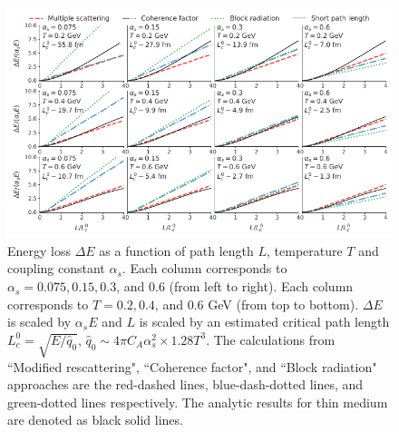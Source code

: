 \documentclass[aps, prc, reprint, amsmath, groupedaddress, nofootinbib]{revtex4-1}
\begin{document}
\begin{figure}
\includegraphics[width=\textwidth]{Eloss_Ldep.pdf}
\caption{Energy loss $\Delta E$ as a function of path length $L$, temperature $T$ and coupling constant $\alpha_s$. Each column corresponds to $\alpha_s = 0.075, 0.15, 0.3$, and $0.6$ (from left to right). Each column corresponds to $T = 0.2, 0.4$, and $0.6$ GeV (from top to bottom). $\Delta E$ is scaled by $\alpha_s E$ and $L$ is scaled by an estimated critical path length $L_c^0 = \sqrt{E/\hat{q}_0}$, $\hat{q}_0\sim 4\pi C_A\alpha_s^2 \times 1.28 T^3$. The calculations from ``Modified rescattering", ``Coherence factor", and ``Block radiation" approaches are the red-dashed lines, blue-dash-dotted lines, and green-dotted lines respectively. The analytic results for thin medium are denoted as black solid lines.}
\label{fig:eloss-ldep}
\end{figure}
\end{document}
